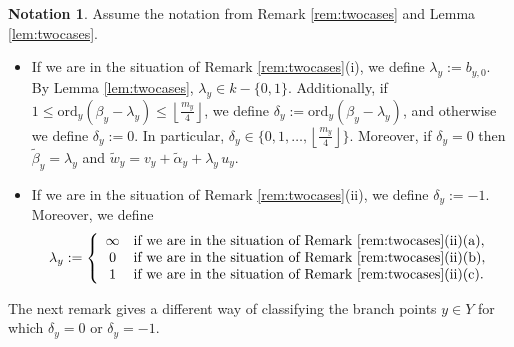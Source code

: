 \documentclass{amsart}
\numberwithin{equation}{section}
\numberwithin{table}{section}
\theoremstyle{plain}
\theoremstyle{definition}
\newtheorem{nota}[theorem]{Notation}
\theoremstyle{remark}
\begin{document}
\begin{nota}
\label{not:twocases}
Assume the notation from Remark \ref{rem:twocases} and Lemma \ref{lem:twocases}. 
\begin{itemize}
\item[(i)] If we are in the situation of Remark \ref{rem:twocases}(i), we define $\lambda_y:=b_{y,0}$.  By Lemma \ref{lem:twocases}, $\lambda_y\in k-\{0,1\}$. Additionally, if $1 \le \mathrm{ord}_y(\beta_y-\lambda_y)\le \left\lfloor \frac{m_y}{4}\right\rfloor$, we define $\delta_y:=\mathrm{ord}_y(\beta_y-\lambda_y)$, and otherwise we define $\delta_y:=0$. In particular,  $\delta_y\in\{0,1,\ldots,\left\lfloor \frac{m_y}{4}\right\rfloor\}$. Moreover, if $\delta_y=0$ then $\widetilde{\beta}_y=\lambda_y$ and $\widetilde{w}_y=v_y+\widetilde{\alpha}_y+\lambda_y\, u_y$.
\item[(ii)] If we are in the situation of Remark \ref{rem:twocases}(ii), we define $\delta_y:=-1$. Moreover, we define 
$$\lambda_y:=\left\{\begin{array}{cl} \infty & \mbox{if we are in the situation of Remark \ref{rem:twocases}(ii)(a)},\\
0 & \mbox{if we are in the situation of Remark \ref{rem:twocases}(ii)(b)},\\
1 & \mbox{if we are in the situation of Remark \ref{rem:twocases}(ii)(c)}.
\end{array}\right.$$
\end{itemize}
\end{nota}

The next remark gives a different way of classifying the branch points $y\in Y$ for which $\delta_y=0$ or $\delta_y=-1$.
\end{document}
